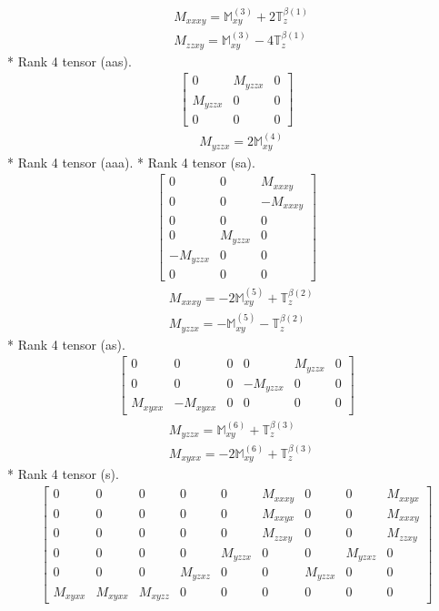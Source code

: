\documentclass[fleqn,8pt,landscape]{jsarticle}
\begin{document}
\begin{align*}
& M_{xxxy} = \mathbb{M}_{xy}^{(3)} + 2 \mathbb{T}_{z}^{\beta(1)} \\
& M_{zzxy} = \mathbb{M}_{xy}^{(3)} - 4 \mathbb{T}_{z}^{\beta(1)}
\end{align*}
* Rank 4 tensor (aas).
\begin{align*}
\begin{bmatrix} 0 & M_{yzzx} & 0 \\ M_{yzzx} & 0 & 0 \\ 0 & 0 & 0 \end{bmatrix}
\end{align*}
\begin{align*}
& M_{yzzx} = 2 \mathbb{M}_{xy}^{(4)}
\end{align*}
* Rank 4 tensor (aaa).
* Rank 4 tensor (sa).
\begin{align*}
\begin{bmatrix} 0 & 0 & M_{xxxy} \\ 0 & 0 & - M_{xxxy} \\ 0 & 0 & 0 \\ 0 & M_{yzzx} & 0 \\ - M_{yzzx} & 0 & 0 \\ 0 & 0 & 0 \end{bmatrix}
\end{align*}
\begin{align*}
& M_{xxxy} = - 2 \mathbb{M}_{xy}^{(5)} + \mathbb{T}_{z}^{\beta(2)} \\
& M_{yzzx} = - \mathbb{M}_{xy}^{(5)} - \mathbb{T}_{z}^{\beta(2)}
\end{align*}
* Rank 4 tensor (as).
\begin{align*}
\begin{bmatrix} 0 & 0 & 0 & 0 & M_{yzzx} & 0 \\ 0 & 0 & 0 & - M_{yzzx} & 0 & 0 \\ M_{xyxx} & - M_{xyxx} & 0 & 0 & 0 & 0 \end{bmatrix}
\end{align*}
\begin{align*}
& M_{yzzx} = \mathbb{M}_{xy}^{(6)} + \mathbb{T}_{z}^{\beta(3)} \\
& M_{xyxx} = - 2 \mathbb{M}_{xy}^{(6)} + \mathbb{T}_{z}^{\beta(3)}
\end{align*}
* Rank 4 tensor (s).
\begin{align*}
\begin{bmatrix} 0 & 0 & 0 & 0 & 0 & M_{xxxy} & 0 & 0 & M_{xxyx} \\ 0 & 0 & 0 & 0 & 0 & M_{xxyx} & 0 & 0 & M_{xxxy} \\ 0 & 0 & 0 & 0 & 0 & M_{zzxy} & 0 & 0 & M_{zzxy} \\ 0 & 0 & 0 & 0 & M_{yzzx} & 0 & 0 & M_{yzxz} & 0 \\ 0 & 0 & 0 & M_{yzxz} & 0 & 0 & M_{yzzx} & 0 & 0 \\ M_{xyxx} & M_{xyxx} & M_{xyzz} & 0 & 0 & 0 & 0 & 0 & 0 \end{bmatrix}
\end{align*}
\end{document}
